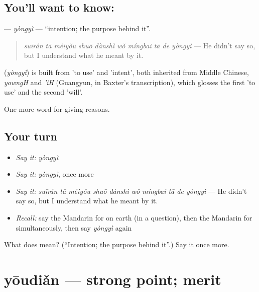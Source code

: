 \subsection*{You'll want to know: }
\textbf{} — \emph{yòngyì} — \textquotedblleft{}intention; the purpose behind it\textquotedblright{}.

\begin{quote}
\textbf{} \emph{suīrán tā méiyǒu shuō dànshì wǒ míngbai tā de yòngyì} — He didn't say so, but I understand what he meant by it.
\end{quote}

\begin{cousinweb}
\textbf{} (\emph{yòngyì}) is built from  'to use' and  'intent', both inherited from Middle Chinese, \emph{yowngH} and \emph{'iH} (Guangyun, in Baxter's transcription), which glosses the first 'to use' and the second 'will'.
\end{cousinweb}

\begin{grammarlens}[title={What you've built}]
One more word for giving reasons.
\end{grammarlens}

\subsection*{Your turn}
\begin{itemize}
\raggedright
  \item \emph{Say it:} \emph{yòngyì}
  \item \emph{Say it:} \emph{yòngyì}, once more
  \item \emph{Say it:} \emph{suīrán tā méiyǒu shuō dànshì wǒ míngbai tā de yòngyì} — He didn't say so, but I understand what he meant by it.
  \item \emph{Recall:} say the Mandarin for on earth (in a question), then the Mandarin for simultaneously, then say \emph{yòngyì} again
\end{itemize}

\begin{tcolorbox}[breakable,colback=teal!4,colframe=teal!35!black,title={Before you move on}]
What does  mean? (\textquotedblleft{}Intention; the purpose behind it\textquotedblright{}.) Say it once more.
\end{tcolorbox}
\section[yōudiǎn]{yōudiǎn — strong point; merit}

